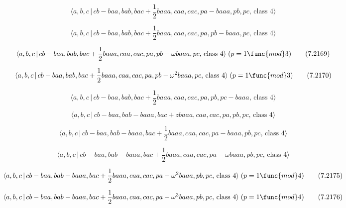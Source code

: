 \documentclass[10pt]{article}
\begin{document}
\begin{equation}
\langle a,b,c\,|\,cb-baa,bab,bac+\frac{1}{2}baaa,caa,cac,pa-baaa,pb,pc,\,%
\text{class }4\rangle  \tag{7.2167}
\end{equation}

\begin{equation}
\langle a,b,c\,|\,cb-baa,bab,bac+\frac{1}{2}baaa,caa,cac,pa,pb-baaa,pc,\,%
\text{class }4\rangle  \tag{7.2168}
\end{equation}

\begin{equation}
\langle a,b,c\,|\,cb-baa,bab,bac+\frac{1}{2}baaa,caa,cac,pa,pb-\omega
baaa,pc,\,\text{class }4\rangle \;(p=1\func{mod}3)  \tag{7.2169}
\end{equation}

\begin{equation}
\langle a,b,c\,|\,cb-baa,bab,bac+\frac{1}{2}baaa,caa,cac,pa,pb-\omega
^{2}baaa,pc,\,\text{class }4\rangle \;(p=1\func{mod}3)  \tag{7.2170}
\end{equation}

\begin{equation}
\langle a,b,c\,|\,cb-baa,bab,bac+\frac{1}{2}baaa,caa,cac,pa,pb,pc-baaa,\,%
\text{class }4\rangle  \tag{7.2171}
\end{equation}

\begin{equation}
\langle a,b,c\,|\,cb-baa,bab-baaa,bac+zbaaa,caa,cac,pa,pb,pc,\,\text{class }%
4\rangle  \tag{7.2172}
\end{equation}

\begin{equation}
\langle a,b,c\,|\,cb-baa,bab-baaa,bac+\frac{1}{2}baaa,caa,cac,pa-baaa,pb,pc,%
\,\text{class }4\rangle  \tag{7.2173}
\end{equation}

\begin{equation}
\langle a,b,c\,|\,cb-baa,bab-baaa,bac+\frac{1}{2}baaa,caa,cac,pa-\omega
baaa,pb,pc,\,\text{class }4\rangle  \tag{7.2174}
\end{equation}

\begin{equation}
\langle a,b,c\,|\,cb-baa,bab-baaa,bac+\frac{1}{2}baaa,caa,cac,pa-\omega
^{2}baaa,pb,pc,\,\text{class }4\rangle \;(p=1\func{mod}4)  \tag{7.2175}
\end{equation}

\begin{equation}
\langle a,b,c\,|\,cb-baa,bab-baaa,bac+\frac{1}{2}baaa,caa,cac,pa-\omega
^{3}baaa,pb,pc,\,\text{class }4\rangle \;(p=1\func{mod}4)  \tag{7.2176}
\end{equation}
\end{document}
